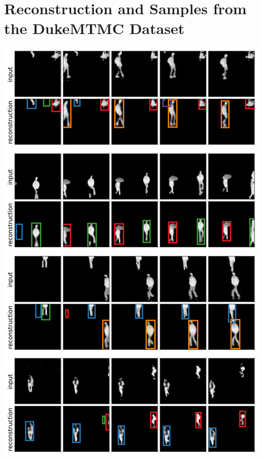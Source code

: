 \section{Reconstruction and Samples from the DukeMTMC Dataset}
\label{app:duke_visual}

\begin{center}
    \begin{minipage}[c]{0.49\linewidth}
        \centering
        \includegraphics[width=\linewidth]{figures/SQAIR/duke_rec/000093.png}
        \includegraphics[width=\linewidth]{figures/SQAIR/duke_rec/000045.png}
        \includegraphics[width=\linewidth]{figures/SQAIR/duke_rec/000047.png}
        \includegraphics[width=\linewidth]{figures/SQAIR/duke_rec/000081.png}

\end{minipage}
\end{center}
